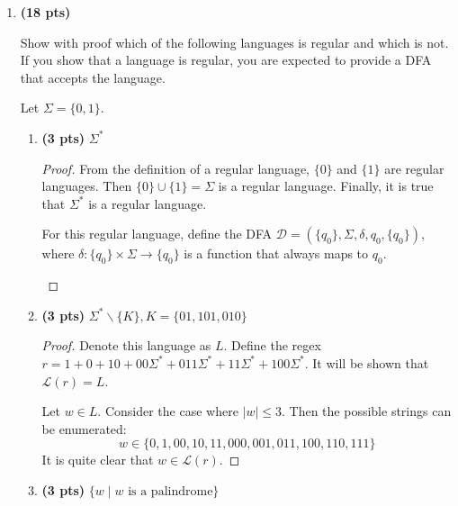 \documentclass[11pt]{article}
\begin{document}
	\begin{enumerate}[label=\textbf{Q\arabic*.}]


\item \textbf{(18 pts)}

Show with proof which of the following languages is regular and which is not. If you show that a language is regular, you are expected to provide a DFA that accepts the language. 

Let $ \Sigma = \{0,1\} $.

\begin{enumerate}[label=\textit{\alph*)}]
	\item \textbf{(3 pts)} $ \Sigma^* $
	
	\begin{proof}
		From the definition of a regular language, \(\{ 0 \} \) and \(\{ 1 \} \) are regular languages. Then \(\{ 0 \} \cup \{ 1 \} = \Sigma\) is a regular language. Finally, it is true that \(\Sigma ^*\) is a regular language.

		For this regular language, define the DFA \(\mathcal{D} = (\{q_0\}, \Sigma, \delta , q_0, \{q_0\})\), where \(\delta : \{q_0\} \times \Sigma \to \{q_0\}\) is a function that always maps to \(q_0\).
		
		\begin{figure}[ht]
			\centering
			\label{fig:DFA for a)}
		\end{figure}

	\end{proof}

	\item \textbf{(3 pts)} $ \Sigma^*\backslash\{K\}, K =\{01, 101, 010\}$
	
	\begin{proof}
		Denote this language as \(L\). Define the regex \(r = 1+0+10+00\Sigma ^*+011\Sigma ^*+11\Sigma ^*+100\Sigma ^*\). It will be shown that \(\mathcal{L} (r) = L\).

		Let \(w \in L\). Consider the case where \(|w| \leq 3\). Then the possible strings can be enumerated:
		\[w \in \{0, 1, 00, 10, 11, 000, 001, 011, 100, 110, 111\}\]
		It is quite clear that \(w \in \mathcal{L} (r)\).

	\end{proof}
	\item \textbf{(3 pts)} $ \{w \mid w \text{ is a palindrome}\} $
	

\end{enumerate}
\end{enumerate}
\end{document}
